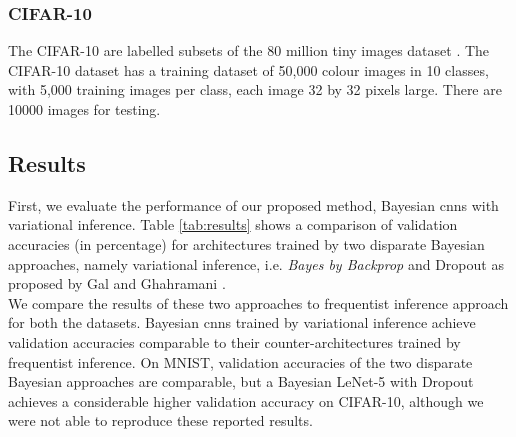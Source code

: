 \subsubsection{CIFAR-10}
The CIFAR-10 are labelled subsets of the 80 million tiny images dataset \cite{Torralba:2008:MTI:1444381.1444403}. The CIFAR-10 dataset has a training dataset of 50,000 colour images in 10 classes, with 5,000 training images per class, each image 32 by 32 pixels large. There are 10000 images for testing. 
\newline

\subsection{Results}
First, we evaluate the performance of our proposed method, Bayesian \acp{cnn} with variational inference. Table \ref{tab:results} shows a comparison of validation accuracies (in percentage) for architectures trained by two disparate Bayesian approaches, namely variational inference, i.e. \textit{Bayes by Backprop} and Dropout as proposed by Gal and Ghahramani \cite{gal2015bayesian}.\\

We compare the results of these two approaches to frequentist inference approach for both the datasets. Bayesian \acp{cnn} trained by variational inference achieve validation accuracies comparable to their counter-architectures trained by frequentist inference. On MNIST, validation accuracies of the two disparate Bayesian approaches are comparable, but a Bayesian LeNet-5 with Dropout achieves a considerable higher validation accuracy on CIFAR-10, although we were not able to reproduce these reported results.
\begin{table}[H]
\tiny
    \centering
    \renewcommand{\arraystretch}{1.5}
    \renewcommand{\arraystretch}{1.5}
    \caption{Comparison of validation accuracies (in percentage) for different architectures with variational inference (VI), frequentist inference and Dropout as a Bayesian approximation as proposed by Gal and Ghahramani \cite{gal2015bayesian} for MNIST, and CIFAR-10.}
    \label{tab:results}
\end{table}

